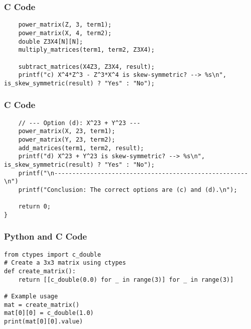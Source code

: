 \documentclass{beamer}
\begin{document}
\begin{frame}[fragile]
\frametitle{C Code}
\begin{lstlisting}
    power_matrix(Z, 3, term1);
    power_matrix(X, 4, term2);
    double Z3X4[N][N];
    multiply_matrices(term1, term2, Z3X4);
    
    subtract_matrices(X4Z3, Z3X4, result);
    printf("c) X^4*Z^3 - Z^3*X^4 is skew-symmetric? --> %s\n", is_skew_symmetric(result) ? "Yes" : "No");
\end{lstlisting}
\end{frame}

\begin{frame}[fragile]
\frametitle{C Code}
\begin{lstlisting}
    // --- Option (d): X^23 + Y^23 ---
    power_matrix(X, 23, term1);
    power_matrix(Y, 23, term2);
    add_matrices(term1, term2, result);
    printf("d) X^23 + Y^23 is skew-symmetric? --> %s\n", is_skew_symmetric(result) ? "Yes" : "No");
    printf("\n------------------------------------------------------\n")
    printf("Conclusion: The correct options are (c) and (d).\n");

    return 0;
}
\end{lstlisting}
\end{frame}

\begin{frame}[fragile]
\frametitle{Python and C Code}
\begin{lstlisting}
from ctypes import c_double
# Create a 3x3 matrix using ctypes
def create_matrix():
    return [[c_double(0.0) for _ in range(3)] for _ in range(3)]

# Example usage
mat = create_matrix()
mat[0][0] = c_double(1.0)
print(mat[0][0].value)

\end{lstlisting}
\end{frame}
\end{document}
